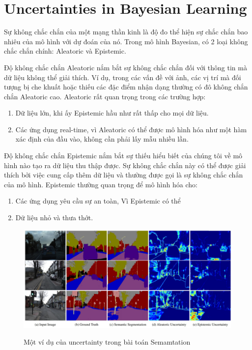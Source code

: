 \section{Uncertainties in Bayesian Learning}

Sự không chắc chắn của một mạng thần kinh là độ đo thể hiện sự chắc chắn bao nhiêu của mô hình với dự đoán của nó. Trong mô hình Bayesian, có 2 loại không chắc chắn chính: Aleatoric và Epistemic.

Độ không chắc chắn Aleatoric nắm bắt sự không chắc chắn đối với thông tin mà dữ liệu không thể giải thích. Ví dụ, trong các vấn đề với ảnh, các vị trí mà đối tượng bị che khuất hoặc thiếu các đặc điểm nhận dạng thường có đô không chắn chắn Aleatoric cao. Aleatoric rất quan trọng trong các trường hợp:
\begin{enumerate}
	\item Dữ liệu lớn, khi ấy Epistemic hầu như rất thấp cho mọi dữ liệu.
	\item Các ứng dụng real-time, vì Aleatoric có thể được mô hình hóa như một hàm xác định của đầu vào, không cần phải lấy mẫu nhiều lần.
\end{enumerate}


Độ không chắc chắn Epistemic nắm bắt sự thiếu hiểu biết của chúng tôi về mô hình nào tạo ra dữ liệu thu thập được. Sự không chắc chắn này có thể được giải thích bởi việc cung cấp thêm dữ liệu và thường được gọi là sự không chắc chắn của mô hình. Epistemic thường quan trọng để mô hình hóa cho:

\begin{enumerate}
	\item Các ứng dụng yêu cầu sự an toàn, Vì Epistemic có thể
	\item Dữ liệu nhỏ và thưa thớt.
\end{enumerate}

\begin{figure}[h]
	\begin{center}
		\includegraphics[height=.25\textheight]{Chuong3/Figs/uncertainty.png}
		\label{fig:minh hoa uncertainty}
		\caption{Một ví dụ của uncertainty trong bài toán Semamtation}
	\end{center}
\end{figure}


